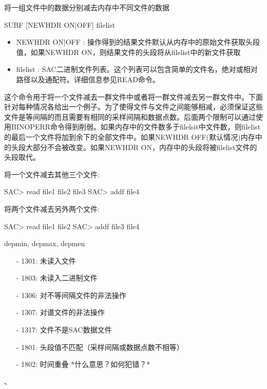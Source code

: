 \label{cmd:subf}

将一组文件中的数据分别减去内存中不同文件的数据

\begin{SACSTX}
SUBF [NEWHDR ON|OFF] filelist
\end{SACSTX}

\begin{itemize}
\item NEWHDR ON|OFF : 操作得到的结果文件默认从内存中的原始文件获取头段值，如果NEWHDR ON，则结果文件的头段将从filelist中的新文件获取 
\item filelist : SAC二进制文件列表。这个列表可以包含简单的文件名，绝对或相对路径以及通配符。详细信息参见READ命令。 
\end{itemize}

这个命令用于将一个文件减去一群文件中或者将一群文件减去另一群文件中。下面针对每种情况各给出一个例子。为了使得文件与文件之间能够相减，必须保证这些文件是等间隔的而且需要有相同的采样间隔和数据点数。后面两个限制可以通过使用BINOPERR命令得到削弱。如果内存中的文件数多于filelsit中文件数，则filelist	的最后一个文件将加到余下的全部文件中。如果NEWHDR OFF(默认情况)内存中的头段大部分不会被改变。如果NEWHDR ON，内存中的头段将被filelist文件的头段取代。

将一个文件减去其他三个文件:
\begin{SACCode}
SAC> read file1 file2 file3
SAC> addf file4
\end{SACCode}

将两个文件减去另外两个文件:
\begin{SACCode}
SAC> read file1 file2
SAC> addf file3 file4
\end{SACCode}

depmin, depmax, depmen

\begin{itemize}
\item[-]1301: 未读入文件
\item[-]1803: 未读入二进制文件
\item[-]1306: 对不等间隔文件的非法操作
\item[-]1307: 对谱文件的非法操作
\item[-]1317: 文件不是SAC数据文件
\item[-]1801: 头段值不匹配（采样间隔或数据点数不相等）
\end{itemize}

\begin{itemize}
\item[-]1802: 时间重叠  *什么意思？如何犯错？*
\end{itemize}

、
